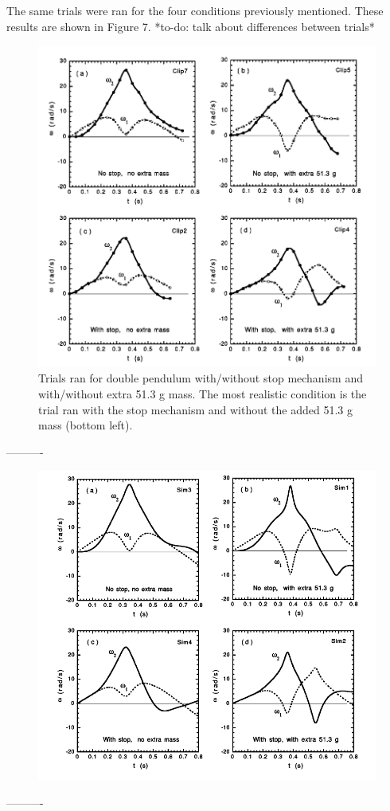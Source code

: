 \documentclass[%
 aip,
 amsmath,amssymb,
 reprint,%
 floatfix,%
]{revtex4-1}
\begin{document}
The same trials were ran for the four conditions previously mentioned. These results are shown in Figure 7. *to-do: talk about differences between trials*

\begin{figure}[H]
	\centering
	\includegraphics[scale=0.25]{angularvelocities.png}
	\caption{Trials ran for double pendulum with/without stop mechanism and with/without extra 51.3 g mass. The most realistic condition is the trial ran with the stop mechanism and without the added 51.3 g mass (bottom left).}
\end{figure}

----------
\begin{figure}[H]
	\centering
	\includegraphics[scale=0.25]{analyticalresults.png}
	\caption{}
\end{figure}
----------
\end{document}
